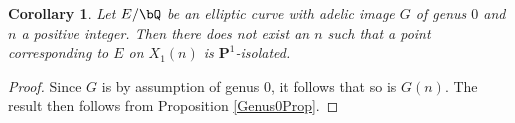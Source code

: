 \documentclass[11pt,reqno]{amsart}
\theoremstyle{plain}
\newtheorem{corollary}[theorem]{Corollary}
\theoremstyle{definition}
\newcommand{\Q}{\bQ}
\newcommand{\Z}{\bZ}
\newcommand{\PP}{\mathbf P}
\begin{document}
\begin{corollary}
Let $E/\Q$ be an elliptic curve with adelic image $G$ of genus $0$ and $n$ a positive integer. Then there does not exist an $n$ such that a point corresponding to $E$ on $X_1(n)$ is $\PP^1$-isolated.
\end{corollary}
\begin{proof}
Since $G$ is by assumption of genus $0$, it follows that so is $G(n)$. The result then follows from Proposition \ref{Genus0Prop}.
\end{proof}

\begin{comment}
are of degree $d$.
Let $x'\in f^{-1}(x) \subseteq X_{B}$ be a point corresponding to $E$, and let $g\colon X_{B}\rightarrow X_1(n)$ be the map induced by the inclusion $B_1(N) \supseteq B$. The point $x'$ lies on a $\PP^1$ inside $X_B^{(d)}$ and hence $g(x')$ lies on a $\PP^1$ inside $X_1(n)^{(d)}$. Since no Abelian variety has $\PP^1$ as a subvariety, $\Phi_d$ contracts this $\PP^1$ inside $X_1(n)^{(d)}$ to a single point; it follows that $g(x')$ is not $\PP^1$-isolated.







We have the following commutative diagram:

$$
\xymatrix{
& X_B \ar[r]^{g} \ar[d]^{f} & X_1(N) \ar[d]^{q} \\
&X_{G(N)} \ar[r]^{h} & X_{G'},
}
$$
where $G'$ is defined to be the subgroup of $\GL_2(\Z/N\Z)$ generated by the union of $B_1(N)$ and $G(N)$, and the maps $q:X_1(N) \rightarrow X_{G'}$ and $h:X_G(N) \rightarrow X_{G'}$ are induced by the inclusion of the corresponding subgroups. The curve $X_{G'}$ is obviously of genus $0$ as it is covered by $X_{G(N)}$ of genus 0.

As $g(x')$ is of degree $d$ and $q(g(x'))=h(x)\in X_{G'}(\Q)$, it follows $\deg q\geq d$. Alternatively, the same conclusion follows from $\deg q=[\pm G':\pm B_1(N)]\geq [\pm G':\pm B]=d. $


\end{comment}
\end{document}
